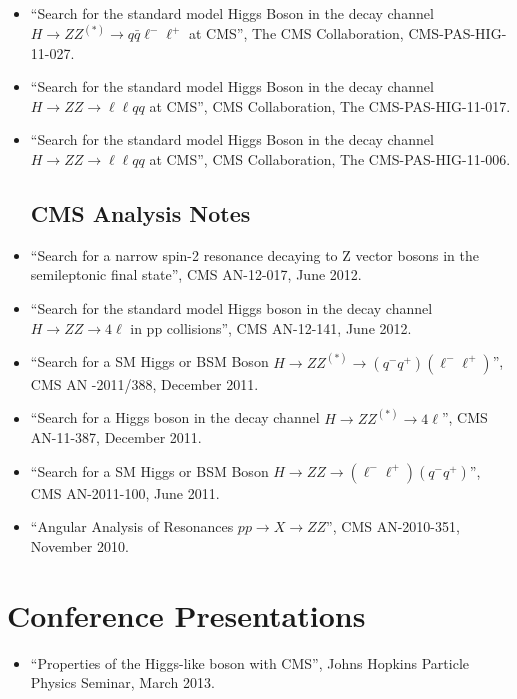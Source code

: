 \documentclass[12pt,oneside,final]{thesis}
\begin{document}
\begin{vita}
\begin{itemize}
\item ``Search for the standard model Higgs Boson in the decay channel $H \to ZZ^{(*)} \to q \bar{q} \ell^-\ell^+$ at CMS'', The CMS Collaboration, CMS-PAS-HIG-11-027.

\item ``Search for the standard model Higgs Boson in the decay channel $H \to ZZ \to \ell\ell qq$ at CMS'', CMS Collaboration, The CMS-PAS-HIG-11-017.

\item ``Search for the standard model Higgs Boson in the decay channel $H \to ZZ \to \ell\ell qq$ at CMS'', CMS Collaboration, The CMS-PAS-HIG-11-006.

\subsection*{CMS Analysis Notes}

\item ``Search for a narrow spin-2 resonance decaying to Z vector bosons in the semileptonic final state'', CMS AN-12-017, June 2012.

\item ``Search for the standard model Higgs boson in the decay channel $H \to ZZ \to 4\ell$ in pp collisions'', CMS AN-12-141, June 2012.

\item ``Search for a SM Higgs or BSM Boson $H \to ZZ^{(*)} \to (q^-q^+)(\ell^-\ell^+)$'', CMS AN -2011/388, December 2011.

\item ``Search for a Higgs boson in the decay channel $H \to ZZ^{(*)} \to 4\ell$'', CMS AN-11-387, December 2011.

\item ``Search for a SM Higgs or BSM Boson $H \to ZZ \to (\ell^-\ell^+)(q^-q^+)$'', CMS AN-2011-100, June 2011.

\item ``Angular Analysis of Resonances $pp \to X \to ZZ$'', CMS AN-2010-351, November 2010.

\end{itemize}

\section*{Conference Presentations}

\begin{itemize}

\item ``Properties of the Higgs-like boson with CMS'', Johns Hopkins Particle Physics Seminar, March 2013.


\end{itemize}
\end{vita}
\end{document}
